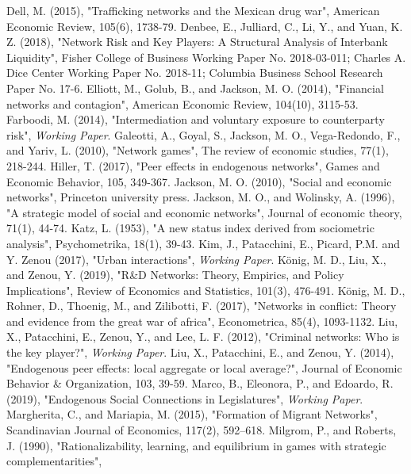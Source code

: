 \documentclass[12pt]{article}
\theoremstyle{definition}
\begin{document}
\begin{thebibliography}{99}
	Dell, M. (2015),
	"Trafficking networks and the Mexican drug war",
	American Economic Review, 105(6), 1738-79.
	Denbee, E., Julliard, C., Li, Y., and Yuan, K. Z. (2018),
	"Network Risk and Key Players: A Structural Analysis of Interbank Liquidity",
	Fisher College of Business Working Paper No. 2018-03-011;
	Charles A. Dice Center Working Paper No. 2018-11;
	Columbia Business School Research Paper No. 17-6. 
	Elliott, M., Golub, B., and Jackson, M. O. (2014),
	"Financial networks and contagion",
	American Economic Review, 104(10), 3115-53.
	Farboodi, M. (2014),
	"Intermediation and voluntary exposure to counterparty risk",
	\textit{Working Paper}.
	Galeotti, A., Goyal, S., Jackson, M. O., Vega-Redondo, F., and Yariv, L. (2010),
	"Network games",
	The review of economic studies, 77(1), 218-244.
	Hiller, T. (2017),
	"Peer effects in endogenous networks",
	Games and Economic Behavior, 105, 349-367.
	Jackson, M. O. (2010),
	"Social and economic networks",
	Princeton university press.
	Jackson, M. O., and Wolinsky, A. (1996),
	"A strategic model of social and economic networks",
	Journal of economic theory, 71(1), 44-74.
	Katz, L. (1953),
	"A new status index derived from sociometric analysis",
	Psychometrika, 18(1), 39-43.
	Kim, J., Patacchini, E., Picard, P.M. and Y. Zenou (2017),
	"Urban interactions",
	\textit{Working Paper}.
	K\"{o}nig, M. D., Liu, X., and Zenou, Y. (2019),
	"R\&D Networks: Theory, Empirics, and Policy Implications",
	Review of Economics and Statistics, 101(3), 476-491.
	K\"{o}nig, M. D., Rohner, D., Thoenig, M., and Zilibotti, F. (2017),
	"Networks in conflict: Theory and evidence from the great war of africa",
	Econometrica, 85(4), 1093-1132.
	Liu, X., Patacchini, E., Zenou, Y., and Lee, L. F. (2012),
	"Criminal networks: Who is the key player?",
	\textit{Working Paper}.
	Liu, X., Patacchini, E., and Zenou, Y. (2014),
	"Endogenous peer effects: local aggregate or local average?",
	Journal of Economic Behavior \& Organization, 103, 39-59.
	Marco, B., Eleonora, P., and Edoardo, R. (2019),
	"Endogenous Social Connections in Legislatures",
	\textit{Working Paper}.
	Margherita, C., and Mariapia, M. (2015),
	"Formation of Migrant  Networks",
	Scandinavian Journal of Economics, 117(2), 592–618.
	Milgrom, P., and Roberts, J. (1990),
	"Rationalizability, learning, and equilibrium in games with strategic complementarities",

\end{thebibliography}
\end{document}
